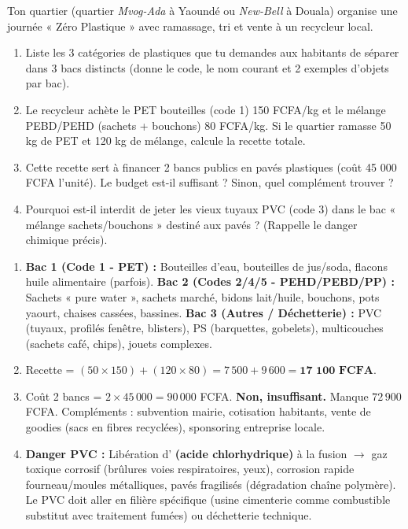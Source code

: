 \documentclass[11pt]{article}
\begin{document}
\begin{exercice}
Ton quartier (quartier \emph{Mvog-Ada} à Yaoundé ou \emph{New-Bell} à Douala) organise une journée « Zéro Plastique » avec ramassage, tri et vente à un recycleur local.
\begin{enumerate}
    \item Liste les 3 catégories de plastiques que tu demandes aux habitants de séparer dans 3 bacs distincts (donne le code, le nom courant et 2 exemples d'objets par bac).
    \item Le recycleur achète le PET bouteilles (code 1) 150 FCFA/kg et le mélange PEBD/PEHD (sachets + bouchons) 80 FCFA/kg. Si le quartier ramasse 50 kg de PET et 120 kg de mélange, calcule la recette totale.
    \item Cette recette sert à financer 2 bancs publics en pavés plastiques (coût 45 000 FCFA l'unité). Le budget est-il suffisant ? Sinon, quel complément trouver ?
    \item Pourquoi est-il interdit de jeter les vieux tuyaux PVC (code 3) dans le bac « mélange sachets/bouchons » destiné aux pavés ? (Rappelle le danger chimique précis).
\end{enumerate}
\end{exercice}

\begin{corrige}
\begin{enumerate}
    \item \textbf{Bac 1 (Code 1 - PET) :} Bouteilles d'eau, bouteilles de jus/soda, flacons huile alimentaire (parfois). \textbf{Bac 2 (Codes 2/4/5 - PEHD/PEBD/PP) :} Sachets « pure water », sachets marché, bidons lait/huile, bouchons, pots yaourt, chaises cassées, bassines. \textbf{Bac 3 (Autres / Déchetterie) :} PVC (tuyaux, profilés fenêtre, blisters), PS (barquettes, gobelets), multicouches (sachets café, chips), jouets complexes.
    \item Recette = $(50 \times 150) + (120 \times 80) = 7\,500 + 9\,600 = \textbf{17 100 FCFA}$.
    \item Coût 2 bancs = $2 \times 45\,000 = 90\,000$ FCFA. \textbf{Non, insuffisant.} Manque $72\,900$ FCFA. Compléments : subvention mairie, cotisation habitants, vente de goodies (sacs en fibres recyclées), sponsoring entreprise locale.
    \item \textbf{Danger PVC :} Libération d'\textbf{ (acide chlorhydrique)} à la fusion $\rightarrow$ gaz toxique corrosif (brûlures voies respiratoires, yeux), corrosion rapide fourneau/moules métalliques, pavés fragilisés (dégradation chaîne polymère). Le PVC doit aller en filière spécifique (usine cimenterie comme combustible substitut avec traitement fumées) ou déchetterie technique.
\end{enumerate}
\end{corrige}
\end{document}
